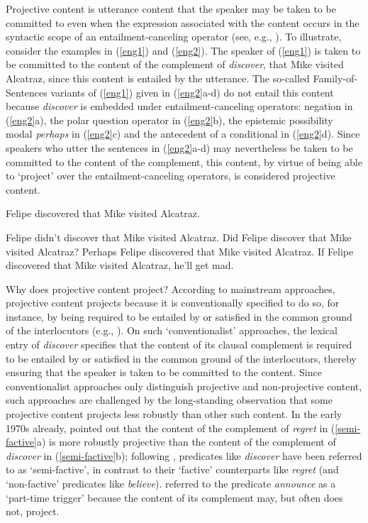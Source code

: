 \documentclass[11pt,fleqn]{article}
\newcommand{\6}{\mbox{$[\hspace*{-.6mm}[$}}
\newcommand{\9}{\mbox{$]\hspace*{-.6mm}]$}}
\begin{document}
Projective content is utterance content that the speaker may be taken to be committed to even when the expression associated with the content occurs in the syntactic scope of an entailment-canceling operator (see, e.g., \citealt{ccmg90}). To illustrate, consider the examples in (\ref{eng1}) and (\ref{eng2}). The speaker of (\ref{eng1}) is taken to be committed to the content of the complement of {\em discover}, that Mike visited Alcatraz, since this content is entailed by the utterance. The so-called Family-of-Sentences variants of (\ref{eng1}) given in (\ref{eng2}a-d) do not entail this content because {\em discover} is embedded under entailment-canceling operators: negation in (\ref{eng2}a), the polar question operator in (\ref{eng2}b), the epistemic possibility modal {\em perhaps} in (\ref{eng2}c) and the antecedent of a conditional in (\ref{eng2}d). Since speakers who utter the sentences in (\ref{eng2}a-d) may nevertheless be taken to be committed to the content of the complement, this content, by virtue of being able to `project' over the entailment-canceling operators, is considered projective content. 

\begin{exe}
\ex\label{eng1}  Felipe discovered that Mike visited Alcatraz.

\ex\label{eng2}
\begin{xlist} 
\ex Felipe didn't discover that Mike visited Alcatraz.
\ex Did Felipe discover that Mike visited Alcatraz?
\ex Perhaps Felipe discovered that Mike visited Alcatraz.
\ex If Felipe discovered that Mike visited Alcatraz, he'll get mad.
\end{xlist}
\end{exe}

Why does projective content project? According to mainstream approaches, projective content projects because it is conventionally specified to do so, for instance, by being required to be entailed by or satisfied in the common ground of the interlocutors (e.g., \citealt{heim83,vds92,geurts99}). On such `conventionalist' approaches, the lexical entry of {\em discover} specifies that the content of its clausal complement is required to be entailed by or satisfied in the common ground of the interlocutors, thereby ensuring that the speaker is taken to be committed to the content. Since conventionalist approaches only distinguish projective and non-projective content, such approaches are challenged by the long-standing observation that some projective content projects less robustly than other such content. In the early 1970s already, \citet{karttunen71b} pointed out that the content of the complement of {\em regret} in (\ref{semi-factive}a) is more robustly projective than the content of the complement of {\em discover} in (\ref{semi-factive}b); following \citealt{karttunen71b}, predicates like {\em discover} have been referred to as `semi-factive', in contrast to their `factive' counterparts like {\em regret} (and `non-factive' predicates like {\em believe}). \citet{schlenker10} referred to the predicate {\em announce} as a `part-time trigger' because the content of its complement may, but often does not, project.
\end{document}
